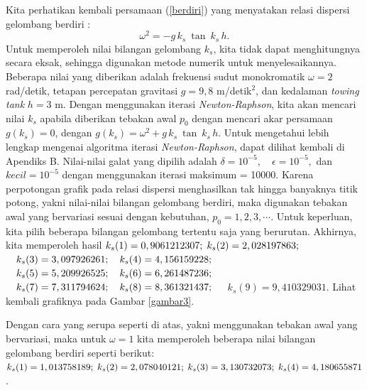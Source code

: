 \documentclass[12pt,a4paper]{report}
\begin{document}
Kita perhatikan kembali persamaan (\ref{berdiri}) yang menyatakan relasi
dispersi gelombang berdiri :
\begin{equation}
\omega^2 = -g\,k_{s}\: \tan\: k_{s}\,h.
\end{equation}
Untuk memperoleh nilai bilangan gelombang $k_{s}$, kita tidak dapat
menghitungnya secara eksak, sehingga digunakan metode numerik untuk
menyelesaikannya. Beberapa nilai yang diberikan adalah frekuensi sudut
monokromatik $\omega = 2$ rad/detik, tetapan percepatan gravitasi $g = 9,8 $
m/detik$^2$, dan kedalaman \textit{towing tank} $h = 3$ m. Dengan
menggunakan iterasi \textit{Newton-Raphson}, kita akan mencari nilai $k_{s}$
apabila diberikan tebakan awal $p_{0}$ dengan mencari akar persamaan $%
g(k_{s})=0$, dengan $g(k_{s}) = \omega^2 + g\,k_{s}\: \tan\: k_{s}\,h$.
Untuk mengetahui lebih lengkap mengenai algoritma iterasi \textit{%
Newton-Raphson}, dapat dilihat kembali di Apendiks B. Nilai-nilai galat yang
dipilih adalah $\delta = 10^{-5}, \quad \epsilon = 10^{-5},$ dan $kecil =
10^{-5}$ dengan menggunakan iterasi maksimum = 10000. Karena perpotongan
grafik pada relasi dispersi menghasilkan tak hingga banyaknya titik potong,
yakni nilai-nilai bilangan gelombang berdiri, maka digunakan tebakan awal
yang bervariasi sesuai dengan kebutuhan, $p_{0} = 1, 2, 3, \cdots.$ Untuk
keperluan, kita pilih beberapa bilangan gelombang tertentu saja yang
berurutan. Akhirnya, kita memperoleh hasil\newline
$k_{s}(1)=0,9061212307;\newline
\; k_{s}(2)=2,028197863;\newline
$ $\quad k_{s}(3)=3,097926261;\newline
\quad k_{s}(4)=4,156159228;\newline
$ $\quad k_{s}(5)=5,209926525;\newline
\quad k_{s}(6)=6,261487236;\newline
$ $\quad k_{s}(7)=7,311794624;\newline
\quad k_{s}(8)=8,361321437;\newline
$ $\quad k_{s}(9)=9,410329031$.\newline
Lihat kembali grafiknya pada Gambar \ref{gambar3}.

Dengan cara yang serupa seperti di atas, yakni menggunakan tebakan awal yang
bervariasi, maka untuk $\omega = 1$ kita memperoleh beberapa nilai bilangan
gelombang berdiri seperti berikut:\newline
$k_{s}(1)=1,013758189;\newline
\; k_{s}(2)=2,078040121;\newline
\; k_{s}(3)=3,130732073;\newline
\; k_{s}(4)=4,180655871$.\newline
\end{document}
